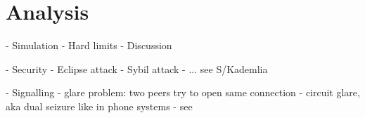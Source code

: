 \chapter{Analysis}
- Simulation
- Hard limits
- Discussion

- Security
    - Eclipse attack
    - Sybil attack
    - ... see S/Kademlia

- Signalling
    - glare problem: two peers try to open same connection
        - circuit glare, aka dual seizure like in phone systems
        - see \cite[pp. 194-194]{signaling-systems-book}
